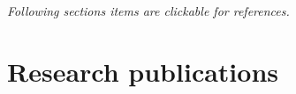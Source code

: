 \documentclass[letterpaper,11pt]{article}
\makeatletter
\newcommand{\resumeSubheading}[4]{
  \vspace{0pt}\item%
    \begin{tabular*}{0.97\textwidth}[t]{l@{\extracolsep{\fill}}r}
      \textbf{#1} & #2 \\
      \textit{\small#3} & \textit{\small #4} \\
    \end{tabular*}\vspace{-5pt}
}
\newcommand{\resumeSubSubheading}[2]{
    \vspace{1pt}
    \begin{tabular*}{0.97\textwidth}{l@{\extracolsep{\fill}}r}
      \textit{\small#1} & \textit{\small #2} \\
    \end{tabular*}\vspace{-5pt}
}
\newcommand{\resumeSubHeadingListStart}{\begin{itemize}[leftmargin=*]}
\newcommand{\resumeSubHeadingListEnd}{\end{itemize}}
\makeatother
\begin{document}
\hfill \textsl{ Following sections items are clickable for references.}
\vspace{-1.5em}

%    
%      
%    
%   
%     
%      
%      
%     
%     
%     




\section{Research publications}
\end{document}
